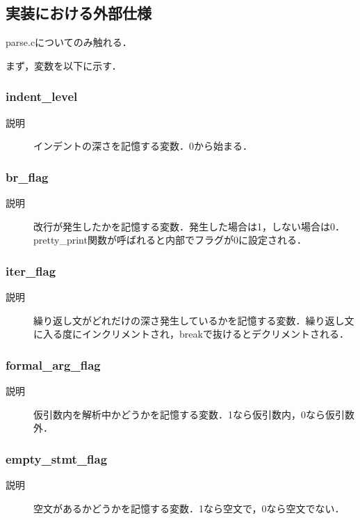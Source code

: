 \documentclass{jlreq}
\begin{document}
\subsection{実装における外部仕様}
parse.cについてのみ触れる．

まず，変数を以下に示す．

\subsubsection{indent\_level}
\begin{description}
  \item[説明] インデントの深さを記憶する変数．0から始まる．
\end{description}

\subsubsection{br\_flag}
\begin{description}
  \item[説明] 改行が発生したかを記憶する変数．発生した場合は1，しない場合は0．pretty\_print関数が呼ばれると内部でフラグが0に設定される．
\end{description}

\subsubsection{iter\_flag}
\begin{description}
  \item[説明] 繰り返し文がどれだけの深さ発生しているかを記憶する変数．繰り返し文に入る度にインクリメントされ，breakで抜けるとデクリメントされる．
\end{description}

\subsubsection{formal\_arg\_flag}
\begin{description}
  \item[説明] 仮引数内を解析中かどうかを記憶する変数．1なら仮引数内，0なら仮引数外．
\end{description}

\subsubsection{empty\_stmt\_flag}
\begin{description}
  \item[説明] 空文があるかどうかを記憶する変数．1なら空文で，0なら空文でない．
\end{description}
\end{document}
